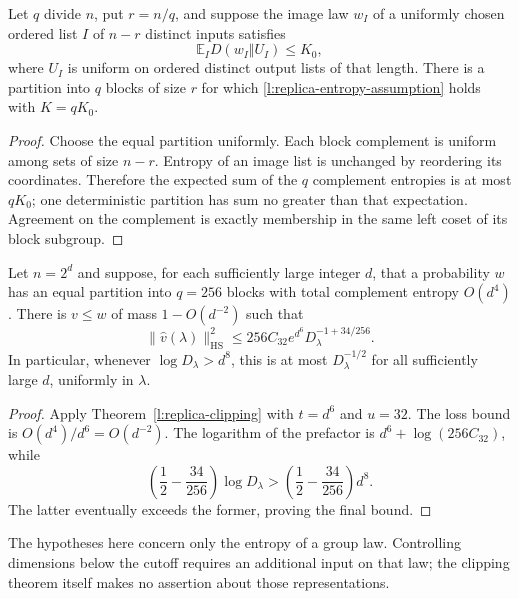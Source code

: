 \begin{corollary}
\label{l:replica-partition-selection}
Let $q$ divide $n$, put $r=n/q$, and suppose the image law $w_I$ of
a uniformly chosen ordered list $I$ of $n-r$ distinct inputs satisfies
\[
 \mathbb E_I D(w_I\Vert U_I)\le K_0,
\]
where $U_I$ is uniform on ordered distinct output lists of that length.
There is a partition into $q$ blocks of size $r$ for which
\eqref{l:replica-entropy-assumption} holds with $K=qK_0$.
\end{corollary}
\begin{proof}
Choose the equal partition uniformly.  Each block complement is
uniform among sets of size $n-r$.  Entropy of an image list is
unchanged by reordering its coordinates.  Therefore the expected sum
of the $q$ complement entropies is at most $qK_0$; one deterministic
partition has sum no greater than that expectation.  Agreement on
the complement is exactly membership in the same left coset of its
block subgroup.
\end{proof}

\begin{corollary}
\label{l:replica-large-dimension}
Let $n=2^d$ and suppose, for each sufficiently large integer $d$, that
a probability $w$ has an equal partition into $q=256$ blocks with
total complement entropy $O(d^4)$.  There is $v\le w$ of mass
$1-O(d^{-2})$ such that
\begin{equation}\label{l:replica-34-exponent}
 \|\widehat v(\lambda)\|_{\mathrm{HS}}^2
 \le256 C_{32}e^{d^6}D_\lambda^{-1+34/256}.
\end{equation}
In particular, whenever $\log D_\lambda>d^8$, this is at most
$D_\lambda^{-1/2}$ for all sufficiently large $d$, uniformly in
$\lambda$.
\end{corollary}
\begin{proof}
Apply Theorem~\ref{l:replica-clipping} with $t=d^6$ and $u=32$.
The loss bound is $O(d^4)/d^6=O(d^{-2})$.
The logarithm of the prefactor is $d^6+\log(256C_{32})$, while
\[
 \left(\frac12-\frac{34}{256}\right)\log D_\lambda
 >\left(\frac12-\frac{34}{256}\right)d^8.
\]
The latter eventually exceeds the former, proving the final bound.
\end{proof}

The hypotheses here concern only the entropy of a group law.
Controlling dimensions below the cutoff requires an additional input
on that law; the clipping theorem itself makes no assertion about
those representations.
